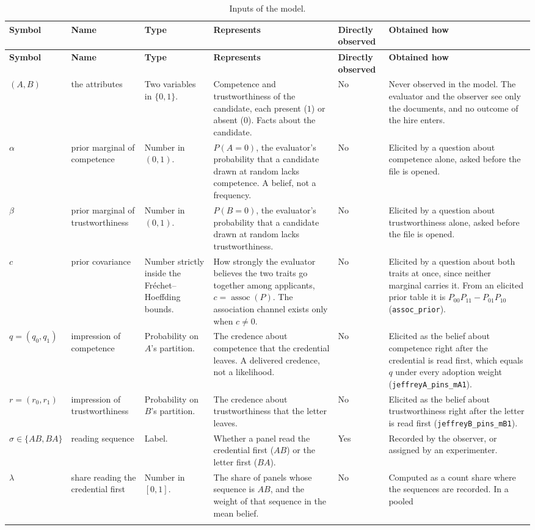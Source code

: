 \documentclass[11pt]{article}
\newcommand{\assoc}{\operatorname{assoc}}
\newcommand{\lean}[1]{\texttt{\scriptsize #1}}
\newcommand{\mm}[6]{#1 & #2 & #3 & #4 & #5 & #6 \\ \addlinespace}
\newcommand{\mmhead}{%
  \toprule
  \textbf{Symbol} & \textbf{Name} & \textbf{Type} & \textbf{Represents} &
  \textbf{Directly observed} & \textbf{Obtained how} \\
  \midrule}
\begin{document}
\footnotesize
\begin{longtable}{@{}P{1.6cm}P{1.9cm}P{1.8cm}P{4.1cm}P{1.2cm}P{4.1cm}@{}}
\caption{Inputs of the model.}\\
\mmhead
\endfirsthead
\mmhead
\endhead
\bottomrule
\endfoot
\mm{$(A,B)$}{the attributes}{Two variables in $\{0,1\}$.}
  {Competence and trustworthiness of the candidate, each present ($1$) or
  absent ($0$). Facts about the candidate.}{No}
  {Never observed in the model. The evaluator and the observer see only the
  documents, and no outcome of the hire enters.}
\mm{$\alpha$}{prior marginal of competence}{Number in $(0,1)$.}
  {$P(A{=}0)$, the evaluator's probability that a candidate drawn at random
  lacks competence. A belief, not a frequency.}{No}
  {Elicited by a question about competence alone, asked before the file is
  opened.}
\mm{$\beta$}{prior marginal of trustworthiness}{Number in $(0,1)$.}
  {$P(B{=}0)$, the evaluator's probability that a candidate drawn at random
  lacks trustworthiness.}{No}
  {Elicited by a question about trustworthiness alone, asked before the file
  is opened.}
\mm{$c$}{prior covariance}{Number strictly inside the Fr\'echet--Hoeffding
  bounds.}
  {How strongly the evaluator believes the two traits go together among
  applicants, $c=\assoc(P)$. The association channel exists only when
  $c\neq0$.}{No}
  {Elicited by a question about both traits at once, since neither marginal
  carries it. From an elicited prior table it is $P_{00}P_{11}-P_{01}P_{10}$
  (\lean{assoc\_prior}).}
\mm{$q=(q_0,q_1)$}{impression of competence}{Probability on $A$'s
  partition.}
  {The credence about competence that the credential leaves. A delivered
  credence, not a likelihood.}{No}
  {Elicited as the belief about competence right after the credential is read
  first, which equals $q$ under every adoption weight
  (\lean{jeffreyA\_pins\_mA1}).}
\mm{$r=(r_0,r_1)$}{impression of trustworthiness}{Probability on $B$'s
  partition.}
  {The credence about trustworthiness that the letter leaves.}{No}
  {Elicited as the belief about trustworthiness right after the letter is read
  first (\lean{jeffreyB\_pins\_mB1}).}
\mm{$\sigma\in\{AB,BA\}$}{reading sequence}{Label.}
  {Whether a panel read the credential first ($AB$) or the letter first
  ($BA$).}{Yes}
  {Recorded by the observer, or assigned by an experimenter.}
\mm{$\lambda$}{share reading the credential first}{Number in $[0,1]$.}
  {The share of panels whose sequence is $AB$, and the weight of that
  sequence in the mean belief.}{No}
  {Computed as a count share where the sequences are recorded. In a pooled
}
\end{longtable}
\end{document}
